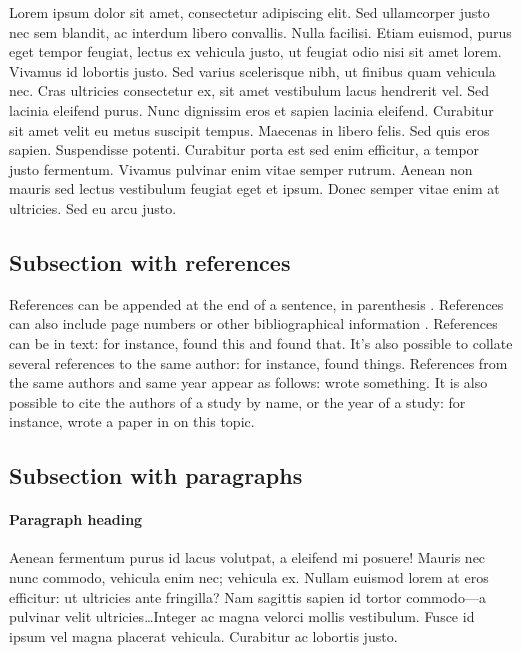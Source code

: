 \documentclass[letterpaper,11pt,leqno]{article}
\begin{document}
Lorem ipsum dolor sit amet, consectetur adipiscing elit. Sed ullamcorper justo nec sem blandit, ac interdum libero convallis. Nulla facilisi. Etiam euismod, purus eget tempor feugiat, lectus ex vehicula justo, ut feugiat odio nisi sit amet lorem. Vivamus id lobortis justo. Sed varius scelerisque nibh, ut finibus quam vehicula nec. Cras ultricies consectetur ex, sit amet vestibulum lacus hendrerit vel. Sed lacinia eleifend purus. Nunc dignissim eros et sapien lacinia eleifend. Curabitur sit amet velit eu metus suscipit tempus. Maecenas in libero felis. Sed quis eros sapien. Suspendisse potenti. Curabitur porta est sed enim efficitur, a tempor justo fermentum. Vivamus pulvinar enim vitae semper rutrum. Aenean non mauris sed lectus vestibulum feugiat eget et ipsum. Donec semper vitae enim at ultricies. Sed eu arcu justo.

\subsection{Subsection with references} 

References can be appended at the end of a sentence, in parenthesis \citep{MS15}. References can also include page numbers or other bibliographical information \citep[p. 1305]{MS19}.  References can be in text: for instance, \citet{M12} found this and \citet[figure 1]{M14} found that. It's also possible to collate several references to the same author: for instance, \citet{M12,M14} found things. References from the same authors and same year appear as follows: \citet{LMS18a,LMS18b} wrote something. It is also possible to cite the authors of a study by name, or the year of a study: for instance, \citeauthor{EMM21} wrote a paper in \citeyear{EMM21} on this topic.

\subsection{Subsection with paragraphs}

\paragraph{Paragraph heading} Aenean fermentum purus id lacus volutpat, a eleifend mi posuere! Mauris nec nunc commodo, vehicula enim nec; vehicula ex. Nullam euismod lorem at eros efficitur: ut ultricies ante fringilla? Nam sagittis sapien id tortor commodo---a pulvinar velit ultricies\ldots Integer ac magna velorci mollis vestibulum. Fusce id ipsum vel magna placerat vehicula. Curabitur ac lobortis justo. 
\end{document}

